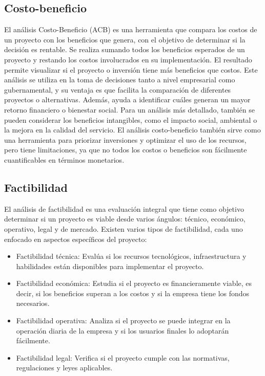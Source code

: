 \documentclass[12pt]{article}
\begin{document}
\subsection*{Costo-beneficio}
El análisis Costo-Beneficio (ACB) es una herramienta que compara los costos de un proyecto con los beneficios que genera, con el objetivo de determinar si la decisión es rentable. Se realiza sumando todos los beneficios esperados de un proyecto y restando los costos involucrados en su implementación. El resultado permite visualizar si el proyecto o inversión tiene más beneficios que costos.
Este análisis se utiliza en la toma de decisiones tanto a nivel empresarial como gubernamental, y su ventaja es que facilita la comparación de diferentes proyectos o alternativas. Además, ayuda a identificar cuáles generan un mayor retorno financiero o bienestar social. Para un análisis más detallado, también se pueden considerar los beneficios intangibles, como el impacto social, ambiental o la mejora en la calidad del servicio. El análisis costo-beneficio también sirve como una herramienta para priorizar inversiones y optimizar el uso de los recursos, pero tiene limitaciones, ya que no todos los costos o beneficios son fácilmente cuantificables en términos monetarios.
\cite{hubspotCostoBeneficio}

\subsection*{Factibilidad}
El análisis de factibilidad es una evaluación integral que tiene como objetivo determinar si un proyecto es viable desde varios ángulos: técnico, económico, operativo, legal y de mercado. Existen varios tipos de factibilidad, cada uno enfocado en aspectos específicos del proyecto:
\begin{itemize}
    \item Factibilidad técnica: Evalúa si los recursos tecnológicos, infraestructura y habilidades están disponibles para implementar el proyecto.
    \item Factibilidad económica: Estudia si el proyecto es financieramente viable, es decir, si los beneficios superan a los costos y si la empresa tiene los fondos necesarios.
    \item Factibilidad operativa: Analiza si el proyecto se puede integrar en la operación diaria de la empresa y si los usuarios finales lo adoptarán fácilmente.
    \item Factibilidad legal: Verifica si el proyecto cumple con las normativas, regulaciones y leyes aplicables.
\end{itemize}
\end{document}
